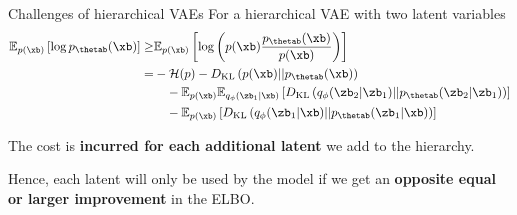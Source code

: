 \begin{frame}{Challenges of hierarchical VAEs}
    For a hierarchical VAE with two latent variables
    \begin{align}
        \mathbb{E}_{p(\xb)} \left[ \log p_\thetab(\xb) \right] \geq& \mathbb{E}_{p(\xb)} \left[ \log \left( p(\xb) \frac{p_\thetab(\xb)}{p(\xb)} \right) \right] \notag \\
                                                            =& -\mathcal{H}(p) - D_\text{KL} \left( p(\xb) || p_\thetab(\xb) \right) \notag \\
                                                                & \quad - \mathbb{E}_{p(\xb)} \mathbb{E}_{q_\phi(\zb_1|\xb)} \left[ D_\text{KL}\left( q_\phi(\zb_2|\zb_1) || p_\thetab(\zb_2|\zb_1) \right) \right] \notag \\
                                                                & \quad - \mathbb{E}_{p(\xb)} \left[ D_\text{KL}\left( q_\phi(\zb_1|\xb) || p_\thetab(\zb_1|\xb) \right) \right]
    \end{align}

    The cost is \textbf{incurred for each additional latent} we add to the hierarchy.
    \vspace{3mm}
    
    Hence, each latent will only be used by the model if we get an \textbf{opposite equal or larger improvement} in the ELBO.
\end{frame}


